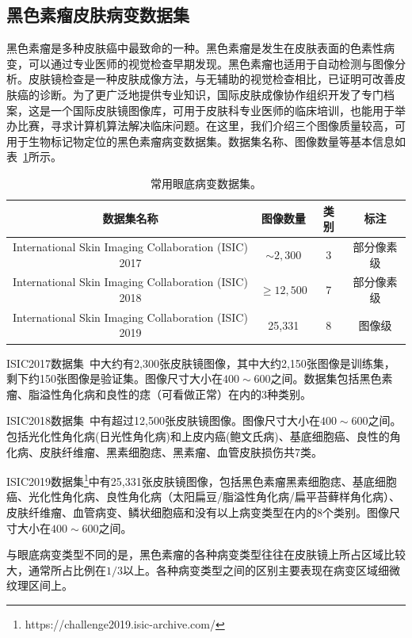 \subsection{黑色素瘤皮肤病变数据集}\label{subsec:original_dermatoscope_ds_intro}
黑色素瘤是多种皮肤癌中最致命的一种。黑色素瘤是发生在皮肤表面的色素性病变，可以通过专业医师的视觉检查早期发现。黑色素瘤也适用于自动检测与图像分析。皮肤镜检查是一种皮肤成像方法，与无辅助的视觉检查相比，已证明可改善皮肤癌的诊断。为了更广泛地提供专业知识，国际皮肤成像协作组织开发了专门档案，这是一个国际皮肤镜图像库，可用于皮肤科专业医师的临床培训，也能用于举办比赛，寻求计算机算法解决临床问题。在这里，我们介绍三个图像质量较高，可用于生物标记物定位的黑色素瘤病变数据集。数据集名称、图像数量等基本信息如表~\ref{tab:skin_datasets_info}所示。


\begin{table}[h]
	\centering
	\caption{常用眼底病变数据集。}		
	\label{tab:skin_datasets_info}
	\begin{tabular}{c|c|c|c}
		\toprule[2pt]
		数据集名称 & 图像数量 & 类别 & 标注 \\
		\midrule[2pt]
		International Skin Imaging Collaboration (ISIC) 2017 &  $\sim 2,300$ & 3 & 部分像素级 \\ \hline
		International Skin Imaging Collaboration (ISIC) 2018 & $\geq 12,500$ & 7  & 部分像素级 \\ \hline
		International Skin Imaging Collaboration (ISIC) 2019 & 25,331 & 8  & 图像级  \\ 
		\bottomrule[2pt]
	\end{tabular}
\end{table}

ISIC2017数据集~\cite{codella2018skin}中大约有2,300张皮肤镜图像，其中大约2,150张图像是训练集，剩下约150张图像是验证集。图像尺寸大小在$400\sim 600$之间。数据集包括黑色素瘤、脂溢性角化病和良性的痣（可看做正常）在内的3种类别。

ISIC2018数据集~\cite{codella2019skin, tschandl2018ham10000}中有超过12,500张皮肤镜图像。图像尺寸大小在$400\sim 600$之间。包括光化性角化病(日光性角化病)和上皮内癌(鲍文氏病)、基底细胞癌、良性的角化病、皮肤纤维瘤、黑素细胞痣、黑素瘤、血管皮肤损伤共7类。

ISIC2019数据集\footnote{https://challenge2019.isic-archive.com/}中有25,331张皮肤镜图像，包括黑色素瘤黑素细胞痣、基底细胞癌、光化性角化病、良性角化病（太阳扁豆/脂溢性角化病/扁平苔藓样角化病）、皮肤纤维瘤、血管病变、鳞状细胞癌和没有以上病变类型在内的8个类别。图像尺寸大小在$400\sim 600$之间。

与眼底病变类型不同的是，黑色素瘤的各种病变类型往往在皮肤镜上所占区域比较大，通常所占比例在$1/3$以上。各种病变类型之间的区别主要表现在病变区域细微纹理区间上。

